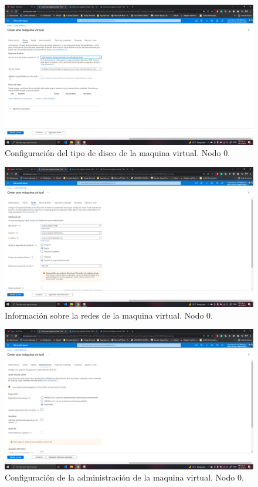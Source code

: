 \documentclass[11pt]{article}
\begin{document}
		\begin{figure}[H]
			\centering
			\includegraphics[scale=0.34]{resources/datosdisco0.png}
			\caption{Configuración del tipo de disco de la maquina virtual. Nodo 0.}\label{fig:picture}
		\end{figure}
		\begin{figure}[H]
			\centering
			\includegraphics[scale=0.34]{resources/datosredes0.png}
			\caption{Información sobre la redes de la maquina virtual. Nodo 0.}\label{fig:picture}
		\end{figure}
		\begin{figure}[H]
			\centering
			\includegraphics[scale=0.34]{resources/datosadministracion0.png}
			\caption{Configuración de la administración de la maquina virtual. Nodo 0.}\label{fig:picture}
		\end{figure}
\end{document}
